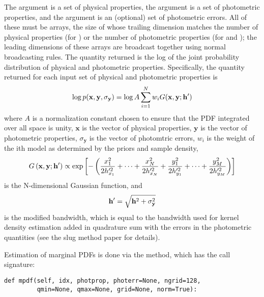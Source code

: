 \documentclass[letterpaper,10pt,english]{sphinxmanual}
\begin{document}
The argument  is a set of physical properties, the argument  is a set of photometric properties, and the argument  is an (optional) set of photometric errors. All of these must be arrays, the size of whose trailing dimension matches the number of physical properties (for ) or the number of photometric properties (for  and ); the leading dimensions of these arrays are broadcast together using normal broadcasting rules. The quantity returned is the log of the joint probability distribution of physical and photometric properties. Specifically, the quantity returned for each input set of physical and photometric properties is
\begin{gather}
\begin{split}\log p(\mathbf{x}, \mathbf{y}, \sigma_{\mathbf{y}}) = \log A \sum_{i=1}^N w_i G(\mathbf{x}, \mathbf{y}; \mathbf{h}')\end{split}\notag
\end{gather}
where \(A\) is a normalization constant chosen to ensure that the PDF integrated over all space is unity, \(\mathbf{x}\) is the vector of physical properties, \(\mathbf{y}\) is the vector of photometric properties, \(\sigma_\mathbf{y}\) is the vector of photomtric errors, \(w_i\) is the weight of the ith model as determined by the priors and sample density,
\begin{gather}
\begin{split}G\left(\mathbf{x}, \mathbf{y}; \mathbf{h}'\right) \propto \exp\left[-\left(\frac{x_1^2}{2h_{x_1}'^2} + \cdots + \frac{x_N^2}{2h_{x_N}'^2} + \frac{y_1^2}{2h_{y_1}'^2} + \cdots + \frac{y_M^2}{2h_{y_M}'^2} \right)\right]\end{split}\notag
\end{gather}
is the N-dimensional Gaussian function, and
\begin{gather}
\begin{split}\mathbf{h'} = \sqrt{\mathbf{h}^2 + \sigma_{\mathbf{y}}^2}\end{split}\notag
\end{gather}
is the modified bandwidth, which is equal to the bandwidth used for kernel density estimation added in quadrature sum with the errors in the photometric quantities (see the slug method paper for details).

Estimation of marginal PDFs is done via the  method, which has the call signature:

\begin{Verbatim}[commandchars=\\\{\}]
def mpdf(self, idx, photprop, photerr=None, ngrid=128,
         qmin=None, qmax=None, grid=None, norm=True):
\end{Verbatim}
\end{document}
